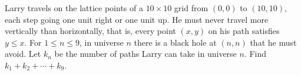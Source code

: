 Larry travels on the lattice points of a $10\times10$ grid from $(0,0)$ to $(10,10)$, each step going one unit right or one unit up. He must never travel more vertically than horizontally, that is, every point $(x,y)$ on his path satisfies $y\le x$. For $1\le n\le9$, in universe $n$ there is a black hole at $(n,n)$ that he must avoid. Let $k_n$ be the number of paths Larry can take in universe $n$. Find $k_1+k_2+\cdots+k_9$.
